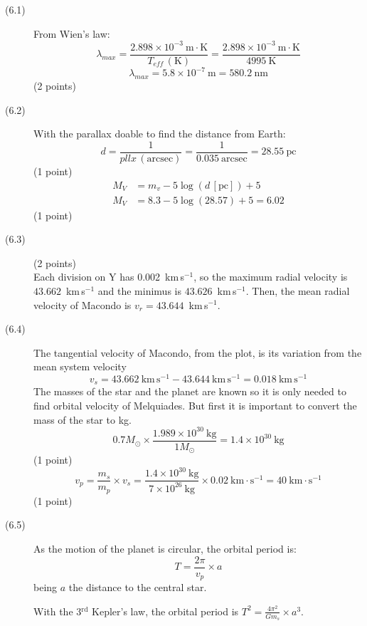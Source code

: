 \begin{description}
\item[(6.1)] From Wien's law:
\[ \lambda_{max} = \frac{2.898\times10^{-3}\ \mathrm{m\cdot K}}{T_{eff}\,(\mathrm{K})}
   = \frac{2.898\times10^{-3}\ \mathrm{m\cdot K}}{4995\ \mathrm{K}} \]
\[ \lambda_{max} = 5.8\times10^{-7}\ \mathrm{m} = 580.2\ \mathrm{nm} \]
\hfill(2 points)

\item[(6.2)] With the parallax doable %
to find the distance from Earth:
\[ d = \frac{1}{pllx\,(\mathrm{arcsec})} = \frac{1}{0.035\ \mathrm{arcsec}}
     = 28.55\ \mathrm{pc} \]
\hfill(1 point)
\begin{align*}
M_V &= m_v - 5\log(d\,[\mathrm{pc}]) + 5\\
M_V &= 8.3 - 5\log(28.57) + 5 = 6.02
\end{align*}
\hfill(1 point)

\item[(6.3)] \hfill(2 points)\\
Each division on Y has 0.002~km\,s$^{-1}$, so the maximum radial velocity is
$43.662$~km\,s$^{-1}$ and the minimus %
is $43.626$~km\,s$^{-1}$. Then, the mean radial velocity of Macondo is
$v_r = 43.644$~km\,s$^{-1}$.

\item[(6.4)] The tangential velocity of Macondo, from the plot, is its
variation from the mean system velocity
\[ v_s = 43.662\ \mathrm{km\,s^{-1}} - 43.644\ \mathrm{km\,s^{-1}}
       = 0.018\ \mathrm{km\,s^{-1}} \]
The masses of the star and the planet are known so it is only needed to find
orbital velocity of Melquiades. But first it is important to convert the mass
of the star to kg.
\[ 0.7M_\odot \times \frac{1.989\times10^{30}\ \mathrm{kg}}{1M_\odot}
   = 1.4\times10^{30}\ \mathrm{kg} \]
\hfill(1 point)
\[ v_p = \frac{m_s}{m_p}\times v_s
       = \frac{1.4\times10^{30}\ \mathrm{kg}}{7\times10^{26}\ \mathrm{kg}}
         \times 0.02\ \mathrm{km\cdot s^{-1}}
       = 40\ \mathrm{km\cdot s^{-1}} \]
\hfill(1 point)

\item[(6.5)] As the motion of the planet is circular, the orbital period is:
\[ T = \frac{2\pi}{v_p}\times a \]
being $a$ the distance to the central star.

With the 3$^{\mathrm{rd}}$ Kepler's law, the orbital period is
$T^2 = \frac{4\pi^2}{Gm_s}\times a^3$.


\end{description}
